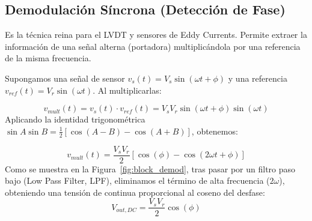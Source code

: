 \begin{marginfigure}
    \centering
    \shorthandoff{>}
    \caption[Acondicionamiento mediante conversión a frecuencia.]{Acondicionamiento mediante conversión a frecuencia. El sensor forma parte de la red de realimentación de un oscilador.}\label{fig:oscilador_sensor}
\end{marginfigure}

\subsection{Demodulación Síncrona (Detección de Fase)}

Es la técnica reina para el LVDT y sensores de Eddy Currents. Permite extraer la información de una señal alterna (portadora) multiplicándola por una referencia de la misma frecuencia. 

Supongamos una señal de sensor $v_s(t) = V_s \sin(\omega t + \phi)$ y una referencia $v_{ref}(t) = V_r \sin(\omega t)$. Al multiplicarlas:

\begin{equation}
    v_{mult}(t) = v_s(t) \cdot v_{ref}(t) = V_s V_r \sin(\omega t + \phi) \sin(\omega t)
\end{equation}
Aplicando la identidad trigonométrica $\sin A \sin B = \frac{1}{2} [\cos(A-B) - \cos(A+B)]$, obtenemos: 

\begin{equation}
    v_{mult}(t) = \frac{V_s V_r}{2} \left[ \cos(\phi) - \cos(2\omega t + \phi) \right]
\end{equation}
Como se muestra en la Figura~\ref{fig:block_demod}, tras pasar por un filtro paso bajo (Low Pass Filter, LPF), eliminamos el término de alta frecuencia ($2\omega$), obteniendo una tensión de continua proporcional al coseno del desfase:
\begin{equation}
    V_{out, DC} = \frac{V_s V_r}{2} \cos(\phi)
\end{equation}

